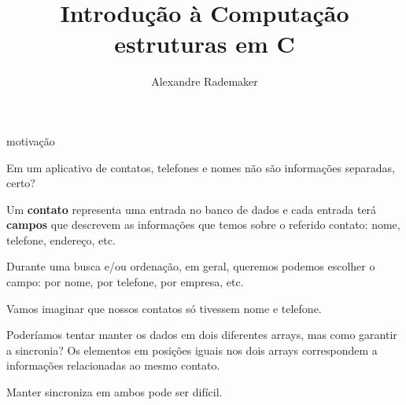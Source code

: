 \documentclass{beamer}
\title{Introdução à Computação \\ estruturas em C}
\author{Alexandre Rademaker}
\date{}
\begin{document}
\begin{frame}
 \maketitle
\end{frame}

\begin{frame}{motivação}

  Em um aplicativo de contatos, telefones e nomes não são informações
  separadas, certo?

  Um \textbf{contato} representa uma entrada no banco de dados e cada
  entrada terá \textbf{campos} que descrevem as informações que temos
  sobre o referido contato: nome, telefone, endereço, etc.

  Durante uma busca e/ou ordenação, em geral, queremos podemos
  escolher o campo: por nome, por telefone, por empresa, etc.

  \framebreak

  Vamos imaginar que nossos contatos só tivessem nome e telefone.

  Poderíamos tentar manter os dados em dois diferentes arrays, mas
  como garantir a sincronia? Os elementos em posições iguais nos dois
  arrays correspondem a informações relacionadas ao mesmo contato.

  Manter sincroniza em ambos pode ser difícil.

  \framebreak

  

\end{frame}  
\end{document}
